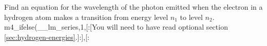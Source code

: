 Find an equation for the wavelength of the photon emitted
when the electron in a hydrogen atom makes a transition from
energy level $n_1$ to level $n_2$.
m4_ifelse(__lm_series,1,[:[You will need to have read optional section \ref{sec:hydrogen-energies}.]:],[:%
\answercheck
